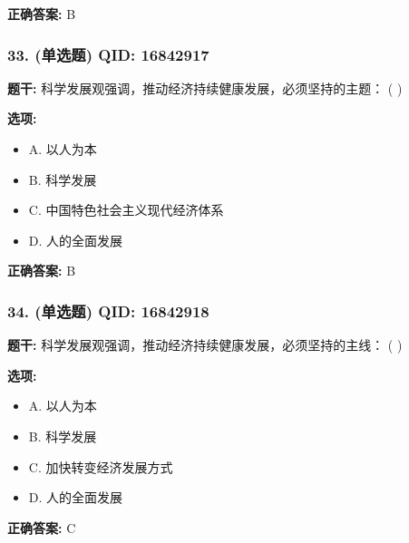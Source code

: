 \documentclass[12pt,UTF8]{ctexart}
\begin{document}
\textbf{正确答案:}
B

\vspace{0.3em}\hrulefill\vspace{0.7em}

\subsubsection*{33. (单选题) \small QID: 16842917}

\textbf{题干:}
科学发展观强调，推动经济持续健康发展，必须坚持的主题： ( )

\textbf{选项:}
\begin{itemize}[leftmargin=*]

  \item A. 以人为本

  \item B. 科学发展

  \item C. 中国特色社会主义现代经济体系

  \item D. 人的全面发展

\end{itemize}

\textbf{正确答案:}
B

\vspace{0.3em}\hrulefill\vspace{0.7em}

\subsubsection*{34. (单选题) \small QID: 16842918}

\textbf{题干:}
科学发展观强调，推动经济持续健康发展，必须坚持的主线： ( )

\textbf{选项:}
\begin{itemize}[leftmargin=*]

  \item A. 以人为本

  \item B. 科学发展

  \item C. 加快转变经济发展方式

  \item D. 人的全面发展

\end{itemize}

\textbf{正确答案:}
C

\vspace{0.3em}\hrulefill\vspace{0.7em}
\end{document}
